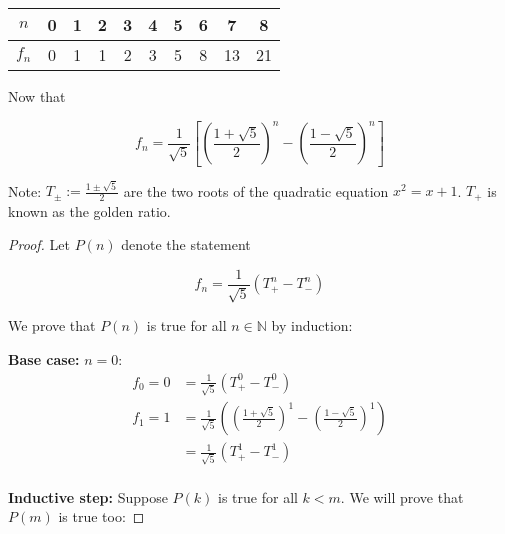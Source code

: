 \documentclass[11pt]{article}
\begin{document}
\begin{enumerate}
        \begin{center}
            \begin{tabular}{|c|c|c|c|c|c|c|c|c|c|}
                \hline
                $n$   & 0 & 1 & 2 & 3 & 4 & 5 & 6 & 7  & 8  \\
                \hline
                $f_n$ & 0 & 1 & 1 & 2 & 3 & 5 & 8 & 13 & 21 \\
                \hline
            \end{tabular}
        \end{center}       
        Now that

          \[
              f_n = \frac{1}{\sqrt{5}} \left[ \left( \frac{1 + \sqrt{5}}{2} \right)^n - \left( \frac{1 - \sqrt{5}}{2} \right)^n \right]
          \]

          Note: $T_{\pm} := \frac{1 \pm \sqrt{5}}{2}$ are the two roots of the quadratic
          equation $x^2 = x + 1$. $T_+$ is known as the golden ratio.

          \begin{proof}

              Let $P(n)$ denote the statement

              \[
                  f_n = \frac{1}{\sqrt{5}} \left( T_+^n - T_-^n \right)
              \]

              We prove that $P(n)$ is true for all $n \in \mathbb{N}$ by induction:

              \textbf{Base case:} $n = 0$:
              \[
                  \begin{aligned}
                      f_0 = 0 & = \frac{1}{\sqrt{5}} \left( T_+^0 - T_-^0 \right)                                                                     \\
                      f_1 = 1 & = \frac{1}{\sqrt{5}} \left( \left( \frac{1 + \sqrt{5}}{2} \right)^1 - \left( \frac{1 - \sqrt{5}}{2} \right)^1 \right) \\
                              & = \frac{1}{\sqrt{5}} \left( T_+^1 - T_-^1 \right)
                  \end{aligned}
              \]
              \\\textbf{Inductive step:} Suppose $P(k)$ is true for all $k < m$. We will prove that $P(m)$ is true too:


\end{proof}
\end{enumerate}
\end{document}

